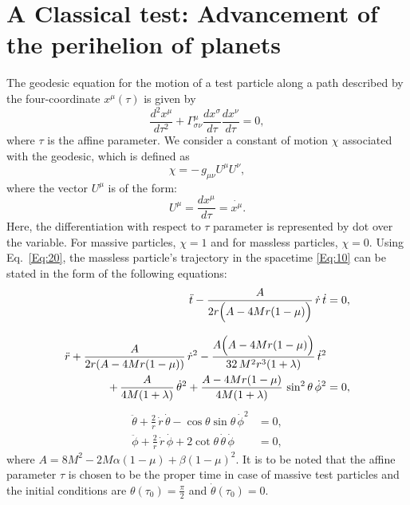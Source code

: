 \documentclass[aps,amsmath,amssymb,showpacs,showkeys]{revtex4}
\begin{document}
\section{A Classical test: Advancement of the perihelion of planets}
\label{sec5}
The geodesic equation for the motion of a test particle along a path described 
by the four-coordinate $x^{\mu}(\tau)$ is given by 
\begin{equation}
\frac{d^2 x^{\mu}}{d\tau^2}+\Gamma^{\mu}_{\sigma\nu} \frac{dx^{\sigma}}{d\tau}\frac{dx^{\nu}}{d\tau}=0,
\label{Eq:20}
\end{equation}
where $\tau$ is the affine parameter. We consider a constant of motion 
$\chi$ associated with the geodesic, which is defined as
\begin{equation}
\chi=-\,g_{\mu\nu}U^{\mu}U^{\nu},
\label{Eq:21}
\end{equation}
where the vector $U^\mu$ is of the form:
\begin{equation}
U^{\mu}=\frac{dx^{\mu}}{d\tau}=\dot{x^{\mu}}.
\label{Eq:22}
\end{equation} 
Here, the differentiation with respect to $\tau$ parameter is represented by 
dot over the variable. For massive particles, $\chi=1$ and for massless 
particles, $\chi=0.$ Using Eq.\ \eqref{Eq:20}, the massless particle's 
trajectory in the spacetime \eqref{Eq:10} can be stated in the form of the 
following equations:
\begin{align}
\ddot{t}-\frac{A}{2 r\Big(A-4 M r (1-\mu)\Big)}\,\dot{r}\,\dot{t}&=0,
\label{Eq:23}\\[8pt]
\ddot{r} +\frac{A}{2 r(A-4 M r(1-\mu))}\, \dot{r}^2 -\frac{A\Big(A -4M r (1-\mu)\Big)}{32\,M^2 r^3 (1+\lambda)}\, \dot{t}^2 \notag\\
+\, \frac{A}{4M(1+\lambda)}\, \dot{\theta}^2 + \frac{A-4M r(1-\mu)}{4M(1+\lambda)} \, \sin^2 \theta \, \dot{\phi}^2&=0,
\label{Eq:24}
\end{align}
\begin{align}
\ddot{\theta}+ \frac{2}{r} \, \dot{r} \, \dot{\theta}- \cos \theta \sin \theta\, \dot{\phi}^2&=0,
\label{Eq:25}\\[8pt]
\ddot{\phi} +\frac{2}{r}\,\dot{r}\,\dot{\phi}+2 \cot \theta\, \dot{\theta}\,\dot{\phi}&=0,
\label{Eq:26}
\end{align}
where $A=8M^2 -2M \alpha (1-\mu)+\beta (1-\mu)^2$. It is to be noted that the 
affine parameter $\tau$ is chosen to be the proper time in case of massive 
test particles and the initial conditions are $\theta(\tau_0)=\frac{\pi}{2}$ 
and $\dot{\theta}(\tau_0)=0$. 
\end{document}
